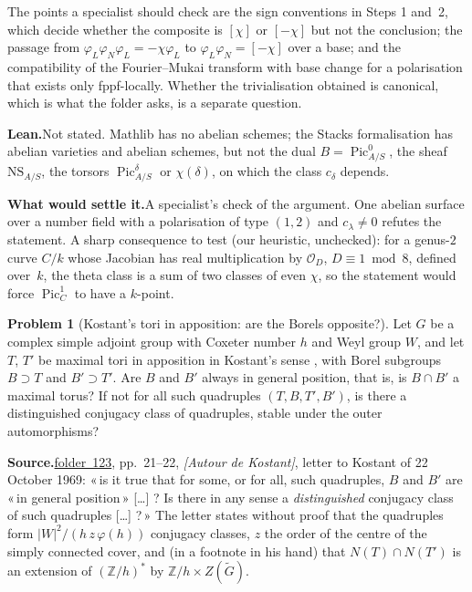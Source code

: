 \documentclass[11pt]{article}
\newcommand{\q}[1]{«\,#1\,»}
\newcommand{\fac}[1]{\href{https://grothendieck.umontpellier.fr/#1.pdf}{folder~#1}}
\newcommand{\Pic}{\operatorname{Pic}}
\theoremstyle{definition}
\newtheorem{problem}{Problem}
\theoremstyle{plain}\newtheorem*{proposition}{Proposition}\theoremstyle{definition}
\newcommand{\entry}[1]{\par\medskip\noindent\textbf{#1}\enspace}
\newcommand{\src}[1]{\entry{Source.}#1}
\newcommand{\leanst}{\entry{Lean.}}
\newcommand{\settle}{\entry{What would settle it.}}
\begin{document}
The points a specialist should check are the sign conventions in Steps 1 and~2, which decide whether the composite is $[\chi]$ or $[-\chi]$ but not the conclusion; the passage from $\varphi_L\varphi_N\varphi_L = -\chi\varphi_L$ to $\varphi_L\varphi_N = [-\chi]$ over a base; and the compatibility of the Fourier--Mukai transform with base change for a polarisation that exists only fppf-locally. Whether the trivialisation obtained is canonical, which is what the folder asks, is a separate question.

\leanst Not stated. Mathlib has no abelian schemes; the Stacks formalisation \cite{axiomstacks} has abelian varieties and abelian schemes, but not the dual $B = \Pic^0_{A/S}$, the sheaf $\mathrm{NS}_{A/S}$, the torsors $\Pic^\delta_{A/S}$ or $\chi(\delta)$, on which the class $c_\delta$ depends.

\settle A specialist's check of the argument. One abelian surface over a number field with a polarisation of type $(1,2)$ and $c_\lambda \ne 0$ refutes the statement. A sharp consequence to test (our heuristic, unchecked): for a genus-$2$ curve $C/k$ whose Jacobian has real multiplication by $\mathcal O_D$, $D \equiv 1 \bmod 8$, defined over~$k$, the theta class is a sum of two classes of even $\chi$, so the statement would force $\Pic^1_C$ to have a $k$-point.

\begin{problem}[Kostant's tori in apposition: are the Borels opposite?]\label{p:kostant}
Let $G$ be a complex simple adjoint group with Coxeter number $h$ and Weyl group $W$, and let $T$, $T'$ be maximal tori in apposition in Kostant's sense \cite{kostant}, with Borel subgroups $B \supset T$ and $B' \supset T'$. Are $B$ and $B'$ always in general position, that is, is $B \cap B'$ a maximal torus? If not for all such quadruples $(T, B, T', B')$, is there a distinguished conjugacy class of quadruples, stable under the outer automorphisms?
\end{problem}

\src{\fac{123}, pp.~21--22, \emph{[Autour de Kostant]}, letter to Kostant of 22 October 1969: \q{is it true that for some, or for all, such quadruples, $B$ and $B'$ are \q{in general position} [\dots] ? Is there in any sense a \emph{distinguished} conjugacy class of such quadruples [\dots] ?} The letter states without proof that the quadruples form $|W|^2/(h\,z\,\varphi(h))$ conjugacy classes, $z$ the order of the centre of the simply connected cover, and (in a footnote in his hand) that $N(T) \cap N(T')$ is an extension of $(\mathbb Z/h)^*$ by $\mathbb Z/h \times Z(\tilde G)$.}
\end{document}
